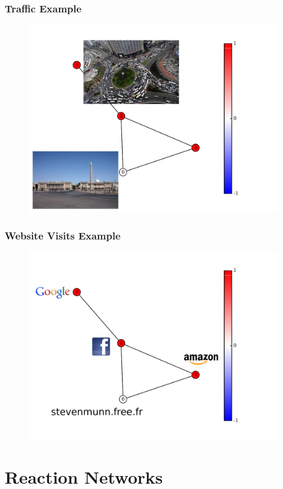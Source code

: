 \documentclass{beamer}
\begin{document}
\begin{frame}
\frametitle{Traffic Example}
\begin{figure}
\includegraphics[width=0.8\linewidth]{figs/trafficEg}
\end{figure}
\end{frame}

\begin{frame}
\frametitle{Website Visits Example}
\begin{figure}
\includegraphics[width=0.8\linewidth]{figs/websitesEg}
\end{figure}
\end{frame}
\section{Reaction Networks}
\end{document}
